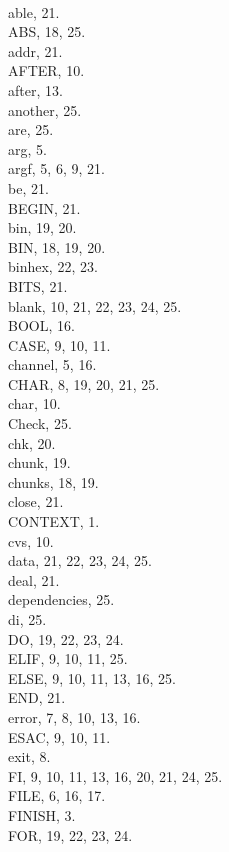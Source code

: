 \inx
\:\\{able}, 21.
\:\\{ABS}, 18, 25.
\:\\{addr}, 21.
\:\\{AFTER}, 10.
\:\\{after}, 13.
\:\\{another}, 25.
\:\\{are}, 25.
\:\\{arg}, 5.
\:\\{argf}, 5, 6, 9, 21.
\:\\{be}, 21.
\:\\{BEGIN}, 21.
\:\\{bin}, 19, 20.
\:\\{BIN}, 18, 19, 20.
\:\\{binhex}, 22, 23.
\:\\{BITS}, 21.
\:\\{blank}, 10, 21, 22, 23, 24, 25.
\:\\{BOOL}, 16.
\:\\{CASE}, 9, 10, 11.
\:\\{channel}, 5, 16.
\:\\{CHAR}, 8, 19, 20, 21, 25.
\:\\{char}, 10.
\:\\{Check}, 25.
\:\\{chk}, 20.
\:\\{chunk}, 19.
\:\\{chunks}, 18, 19.
\:\\{close}, 21.
\:\\{CONTEXT}, 1.
\:\\{cvs}, 10.
\:\\{data}, 21, 22, 23, 24, 25.
\:\\{deal}, 21.
\:\\{dependencies}, 25.
\:\\{di}, 25.
\:\\{DO}, 19, 22, 23, 24.
\:\\{ELIF}, 9, 10, 11, 25.
\:\\{ELSE}, 9, 10, 11, 13, 16, 25.
\:\\{END}, 21.
\:\\{error}, 7, 8, 10, 13, 16.
\:\\{ESAC}, 9, 10, 11.
\:\\{exit}, 8.
\:\\{FI}, 9, 10, 11, 13, 16, 20, 21, 24, 25.
\:\\{FILE}, 6, 16, 17.
\:\\{FINISH}, 3.
\:\\{FOR}, 19, 22, 23, 24.
